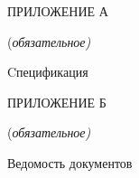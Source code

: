 \newpage
\centerline{ПРИЛОЖЕНИЕ А}
\centerline{(\it{обязательное})}
\centerline{Cпецификация}
\label{sec:appendix_a}

\newpage
\centerline{ПРИЛОЖЕНИЕ Б}
\centerline{(\it{обязательное})}
\centerline{Ведомость документов}
\label{sec:appendix_b}
